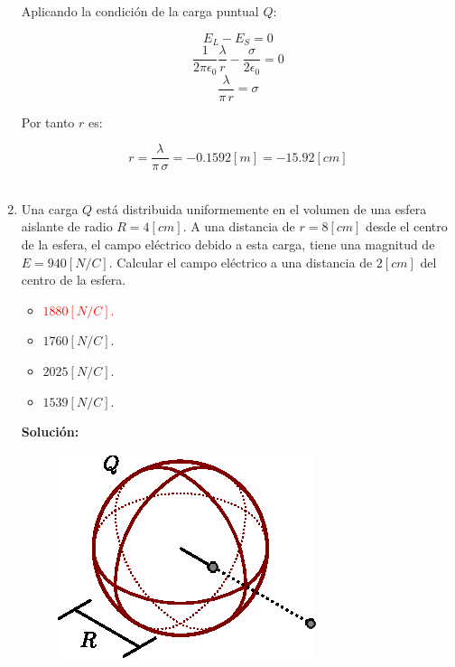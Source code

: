 \documentclass[letter,11pt]{article}
\begin{document}
\begin{enumerate}
Aplicando la condición de la carga puntual $Q$:

\begin{equation*}
    E_L - E_S = 0
\end{equation*}
\begin{equation*}
    \frac{1}{2\pi\epsilon_0}\frac{\lambda}{r}-\frac{\sigma}{2\epsilon_0} = 0
\end{equation*}
\begin{equation*}
    \frac{\lambda}{\pi\,r} = \sigma
\end{equation*}

Por tanto $r$ es:

\begin{equation*}
    r = \frac{\lambda}{\pi\,\sigma} = -0.1592 [m] = -15.92 [cm]
\end{equation*}
\\

\item Una carga $Q$ está distribuida uniformemente en el volumen de una esfera
aislante de radio $R = 4 [cm]$. A una distancia de $r = 8 [cm]$ desde el centro
de la esfera, el campo eléctrico debido a esta carga, tiene una magnitud de
$E = 940 [N/C]$. Calcular el campo eléctrico a una distancia de $2 [cm]$ del
centro de la esfera.

\begin{itemize}
    \item \textcolor{red}{$1880 [N/C]$.}
    \item $1760 [N/C]$.
    \item $2025 [N/C]$.
    \item $1539 [N/C]$.
\end{itemize}

\textbf{Solución:}

\begin{figure}[!h]
\centering
\includegraphics[scale=1.25]{resources/a5.eps}
\end{figure}


\end{enumerate}
\end{document}
